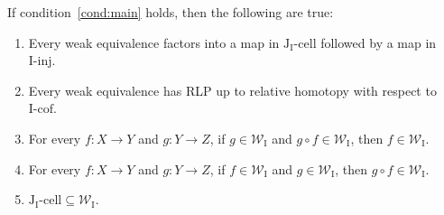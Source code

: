 \documentclass{tac}
\theoremstyle{definition}
\newcommand{\we}{\mathcal{W}}
\newcommand{\I}{\mathrm{I}}
\newcommand{\J}{\mathrm{J}}
\newcommand{\class}[2]{#1\text{-}\mathrm{#2}}
\newcommand{\Iinj}[1][\I]{\class{#1}{inj}}
\newcommand{\Icell}[1][\I]{\class{#1}{cell}}
\newcommand{\Icof}[1][\I]{\class{#1}{cof}}
\newcommand{\Jcell}[1][]{\Icell[\J#1]}
\begin{document}
\begin{lem}[main]
If condition~\eqref{cond:main} holds, then the following are true:
\begin{enumerate}
\item \label{it:we-fact} Every weak equivalence factors into a map in $\Jcell[_\I]$ followed by a map in $\Iinj$.
\item \label{it:we-lift} Every weak equivalence has RLP up to relative homotopy with respect to $\Icof$.
\item \label{it:we-top} For every $f : X \to Y$ and $g : Y \to Z$, if $g \in \we_\I$ and $g \circ f \in \we_\I$, then $f \in \we_\I$.
\item For every $f : X \to Y$ and $g : Y \to Z$, if $f \in \we_\I$ and $g \in \we_\I$, then $g \circ f \in \we_\I$.
\item $\Jcell[_\I] \subseteq \we_\I$.
\end{enumerate}
\end{lem}
\end{document}
